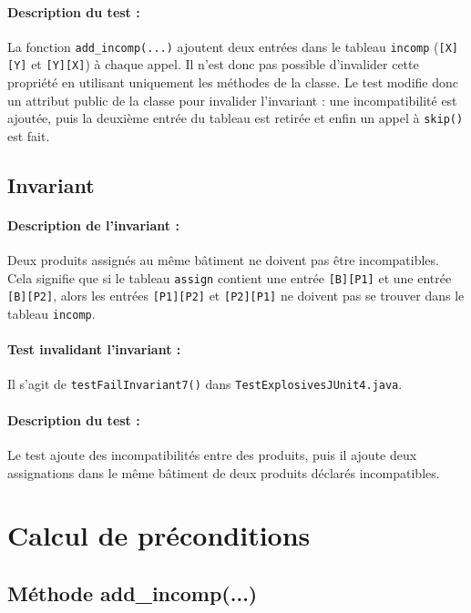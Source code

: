 \documentclass{article}
\begin{document}
\paragraph{Description du test :} La fonction \texttt{add\_incomp(...)} ajoutent deux entrées dans le tableau \texttt{incomp} (\texttt{[X][Y]} et \texttt{[Y][X]}) à chaque appel. Il n'est donc pas possible d'invalider cette propriété en utilisant uniquement les méthodes de la classe. Le test modifie donc un attribut public de la classe pour invalider l'invariant : une incompatibilité est ajoutée, puis la deuxième entrée du tableau est retirée et enfin un appel à \texttt{skip()} est fait.

\subsection{Invariant }

\paragraph{Description de l'invariant :} Deux produits assignés au même bâtiment ne doivent pas être incompatibles. Cela signifie que si le tableau \texttt{assign} contient une entrée \texttt{[B][P1]} et une entrée \texttt{[B][P2]}, alors les entrées \texttt{[P1][P2]} et \texttt{[P2][P1]} ne doivent pas se trouver dans le tableau \texttt{incomp}.

\vspace{-0.2cm}
\paragraph{Test invalidant l'invariant :} Il s'agit de \texttt{testFailInvariant7()} dans \texttt{TestExplosivesJUnit4.java}.

\vspace{-0.2cm}
\paragraph{Description du test :} Le test ajoute des incompatibilités entre des produits, puis il ajoute deux assignations dans le même bâtiment de deux produits déclarés incompatibles.

\newpage

\section{Calcul de préconditions}

\subsection{Méthode add\_incomp(...)}
\end{document}

